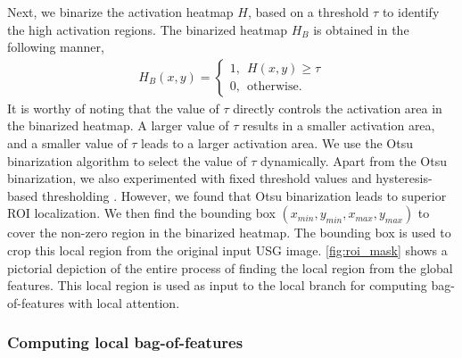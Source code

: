 \documentclass[twocolumn,final]{elsarticle}
\begin{document}
\par Next, we binarize the activation heatmap $H$, based on a threshold $\tau$ to identify the high activation regions. The binarized heatmap $H_B$ is obtained in the following manner, 
%
\begin{align}
    H_B(x,y) = \begin{cases} 1,~~ H(x,y) \geq \tau \\ 0,~~ \text{otherwise}. \end{cases}
\end{align}
%
It is worthy of noting that the value of $\tau$ directly controls the activation area in the binarized heatmap. A larger value of $\tau$ results in a smaller activation area, and a smaller value of $\tau$ leads to a larger activation area. We use the Otsu binarization \citep{otsu1979threshold} algorithm to select the value of $\tau$ dynamically. Apart from the Otsu binarization, we also experimented with fixed threshold values and hysteresis-based thresholding \citep{canny1986computational}. However, we found that Otsu binarization leads to superior ROI localization. We then find the bounding box $(x_{min}, y_{min}, x_{max}, y_{max})$ to cover the non-zero region in the binarized heatmap. The bounding box is used to crop this local region from the original input USG image. \cref{fig:roi_mask} shows a pictorial depiction of the entire process of finding the local region from the global features. This local region is used as input to the local branch for computing bag-of-features with local attention. 

\subsubsection{Computing local bag-of-features}
\end{document}
